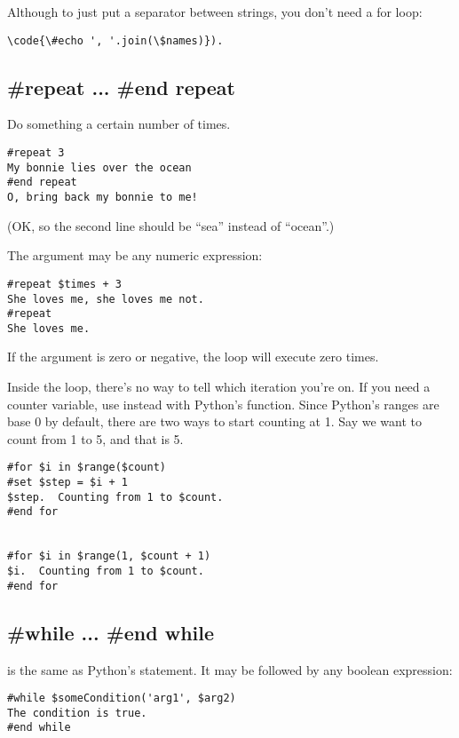 Although to just put a separator between strings, you don't need a for loop:
\begin{verbatim}
\code{\#echo ', '.join(\$names)}).
\end{verbatim}

\subsection{\#repeat ... \#end repeat}
\label{flowControl.repeat}

Do something a certain number of times.
\begin{verbatim}
#repeat 3
My bonnie lies over the ocean
#end repeat
O, bring back my bonnie to me!
\end{verbatim}
(OK, so the second line should be ``sea'' instead of ``ocean''.)

The argument may be any numeric expression:
\begin{verbatim}
#repeat $times + 3
She loves me, she loves me not.
#repeat
She loves me.
\end{verbatim}

If the argument is zero or negative, the loop will execute zero times.

Inside the loop, there's no way to tell which iteration you're on.  If you
need a counter variable, use  instead with Python's 
function.  Since Python's ranges are base 0 by default, there are two ways
to start counting at 1.  Say we want to count from 1 to 5, and that
 is 5.
\begin{verbatim}
#for $i in $range($count)
#set $step = $i + 1
$step.  Counting from 1 to $count.
#end for


#for $i in $range(1, $count + 1)
$i.  Counting from 1 to $count.
#end for
\end{verbatim}


\subsection{\#while ... \#end while}
\label{flowControl.while}

 is the same as Python's  statement.  It may be
followed by any boolean expression:
\begin{verbatim}
#while $someCondition('arg1', $arg2)
The condition is true.
#end while
\end{verbatim}

